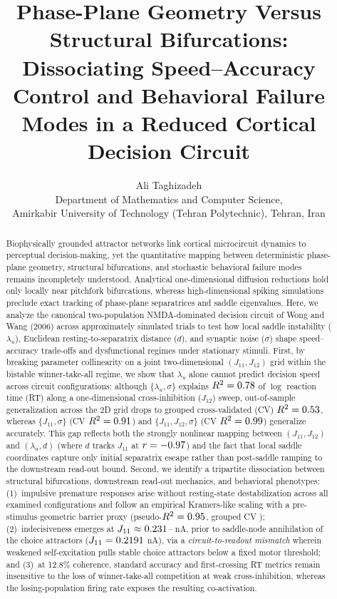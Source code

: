 \documentclass[11pt]{article}
\title{Phase-Plane Geometry Versus Structural Bifurcations: Dissociating Speed--Accuracy Control and Behavioral Failure Modes in a Reduced Cortical Decision Circuit}
\author{Ali Taghizadeh\\[2pt] Department of Mathematics and Computer Science,\\ Amirkabir University of Technology (Tehran Polytechnic), Tehran, Iran}
\date{}
\begin{document}
	\maketitle
	
	\begin{abstract}
		Biophysically grounded attractor networks link cortical microcircuit dynamics to perceptual decision-making, yet the quantitative mapping between deterministic phase-plane geometry, structural bifurcations, and stochastic behavioral failure modes remains incompletely understood. Analytical one-dimensional diffusion reductions hold only locally near pitchfork bifurcations, whereas high-dimensional spiking simulations preclude exact tracking of phase-plane separatrices and saddle eigenvalues. Here, we analyze the canonical two-population NMDA-dominated decision circuit of Wong and Wang (2006) across approximately \nTrialsTotal{} simulated trials to test how local saddle instability ($\lambda_u$), Euclidean resting-to-separatrix distance ($d$), and synaptic noise ($\sigma$) shape speed--accuracy trade-offs and dysfunctional regimes under stationary stimuli. First, by breaking parameter collinearity on a joint two-dimensional $(J_{11},J_{12})$ grid within the bistable winner-take-all regime, we show that $\lambda_u$ alone cannot predict decision speed across circuit configurations: although $\{\lambda_u,\sigma\}$ explains $R^2=0.78$ of $\log$ reaction time (RT) along a one-dimensional cross-inhibition ($J_{12}$) sweep, out-of-sample generalization across the 2D grid drops to grouped cross-validated (CV) $R^2=0.53$, whereas $\{J_{11},\sigma\}$ (CV $R^2=0.91$) and $\{J_{11},J_{12},\sigma\}$ (CV $R^2=0.99$) generalize accurately. This gap reflects both the strongly nonlinear mapping between $(J_{11},J_{12})$ and $(\lambda_u,d)$ (where $d$ tracks $J_{11}$ at $r=-0.97$) and the fact that local saddle coordinates capture only initial separatrix escape rather than post-saddle ramping to the downstream read-out bound. Second, we identify a tripartite dissociation between structural bifurcations, downstream read-out mechanics, and behavioral phenotypes: (1)~impulsive premature responses arise without resting-state destabilization across all \nRestTotal{} examined configurations and follow an empirical Kramers-like scaling with a pre-stimulus geometric barrier proxy (pseudo-$R^2=0.95$, grouped CV \premKPCV); (2)~indecisiveness emerges at $J_{11}\approx0.231$--\JelevenBoundHi{} nA, prior to saddle-node annihilation of the choice attractors ($J_{11}=0.2191$ nA), via a \emph{circuit-to-readout mismatch} wherein weakened self-excitation pulls stable choice attractors below a fixed motor threshold; and (3)~at 12.8\% coherence, standard accuracy and first-crossing RT metrics remain insensitive to the loss of winner-take-all competition at weak cross-inhibition, whereas the losing-population firing rate exposes the resulting co-activation.
	\end{abstract}
	
\end{document}
